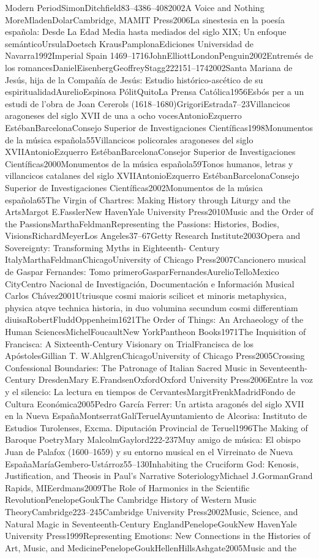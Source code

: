 \documentclass{memoir}
\begin{document}
{{{{{{{{Modern PeriodSimonDitchfield83–4386–4082002A Voice and Nothing MoreMladenDolarCambridge, MAMIT Press2006La sinestesia en la poesía española: Desde La Edad Media hasta mediados del siglo XIX; Un enfoque semánticoUrsulaDoetsch KrausPamplonaEdiciones Universidad de Navarra1992Imperial Spain 1469–1716JohnElliottLondonPenguin2002Entremés de los romancesDanielEisenbergGeoffreyStagg222151–1742002Santa Mariana de Jesús, hija de la Compañía de Jesús: Estudio histórico-ascético de su espiritualidadAurelioEspinosa PólitQuitoLa Prensa Católica1956Esbós per a un estudi de l'obra de Joan Cererols (1618–1680)GrigoriEstrada7–23Villancicos aragoneses del siglo XVII de una a ocho vocesAntonioEzquerro EstébanBarcelonaConsejo Superior de Investigaciones Científicas1998Monumentos de la música española55Villancicos policorales aragoneses del siglo XVIIAntonioEzquerro EstébanBarcelonaConsejor Superior de Investigaciones Científicas2000Monumentos de la música española59Tonos humanos, letras y villancicos catalanes del siglo XVIIAntonioEzquerro EstébanBarcelonaConsejo Superior de Investigaciones Científicas2002Monumentos de la música española65The Virgin of Chartres: Making History through Liturgy and the ArtsMargot E.FasslerNew HavenYale University Press2010Music and the Order of the PassionsMarthaFeldmanRepresenting the Passions: Histories, Bodies, VisionsRichardMeyerLos Angeles37–67Getty Research Institute2003Opera and Sovereignty: Transforming Myths in Eighteenth- Century ItalyMarthaFeldmanChicagoUniversity of Chicago Press2007Cancionero musical de Gaspar Fernandes: Tomo primeroGasparFernandesAurelioTelloMexico CityCentro Nacional de Investigación, Documentación e Información Musical Carlos Chávez2001Utriusque cosmi maioris scilicet et minoris metaphysica, physica atqve technica historia, in duo volumina secundum cosmi differentiam diuisaRobertFluddOppenheim1621The Order of Things: An Archaeology of the Human SciencesMichelFoucaultNew YorkPantheon Books1971The Inquisition of Francisca: A Sixteenth-Century Visionary on TrialFrancisca de los ApóstolesGillian T. W.AhlgrenChicagoUniversity of Chicago Press2005Crossing Confessional Boundaries: The Patronage of Italian Sacred Music in Seventeenth-Century DresdenMary E.FrandsenOxfordOxford University Press2006Entre la voz y el silencio: La lectura en tiempos de CervantesMargitFrenkMadridFondo de Cultura Económica2005Pedro García Ferrer: Un artista aragonés del siglo XVII en la Nueva EspañaMontserratGalíTeruelAyuntamiento de Alcorisa: Instituto de Estudios Turolenses, Excma. Diputación Provincial de Teruel1996The Making of Baroque PoetryMary MalcolmGaylord222-237Muy amigo de música: El obispo Juan de Palafox (1600–1659) y su entorno musical en el Virreinato de Nueva EspañaMaríaGembero-Ustárroz55–130Inhabiting the Cruciform God: Kenosis, Justification, and Theosis in Paul's Narrative SoteriologyMichael J.GormanGrand Rapids, MIEerdmans2009The Role of Harmonics in the Scientific RevolutionPenelopeGoukThe Cambridge History of Western Music TheoryCambridge223–245Cambridge University Press2002Music, Science, and Natural Magic in Seventeenth-Century EnglandPenelopeGoukNew HavenYale University Press1999Representing Emotions: New Connections in the Histories of Art, Music, and MedicinePenelopeGoukHellenHillsAshgate2005Music and the }}}}}}}}
\end{document}
